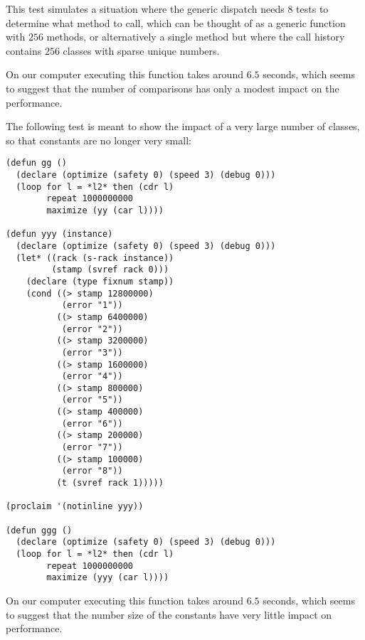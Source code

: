 This test simulates a situation where the generic dispatch needs $8$
tests to determine what method to call, which can be thought of as a
generic function with $256$ methods, or alternatively a single method
but where the call history contains $256$ classes with sparse unique
numbers. 

On our computer executing this function takes around $6.5$ seconds,
which seems to suggest that the number of comparisons has only a
modest impact on the performance.  

The following test is meant to show the impact of a very large number
of classes, so that constants are no longer very small:

\begin{verbatim}
(defun gg ()
  (declare (optimize (safety 0) (speed 3) (debug 0)))
  (loop for l = *l2* then (cdr l)
        repeat 1000000000
        maximize (yy (car l))))

(defun yyy (instance)
  (declare (optimize (safety 0) (speed 3) (debug 0)))
  (let* ((rack (s-rack instance))
         (stamp (svref rack 0)))
    (declare (type fixnum stamp))
    (cond ((> stamp 12800000)
           (error "1"))
          ((> stamp 6400000)
           (error "2"))
          ((> stamp 3200000)
           (error "3"))
          ((> stamp 1600000)
           (error "4"))
          ((> stamp 800000)
           (error "5"))
          ((> stamp 400000)
           (error "6"))
          ((> stamp 200000)
           (error "7"))
          ((> stamp 100000)
           (error "8"))
          (t (svref rack 1)))))

(proclaim '(notinline yyy))

(defun ggg ()
  (declare (optimize (safety 0) (speed 3) (debug 0)))
  (loop for l = *l2* then (cdr l)
        repeat 1000000000
        maximize (yyy (car l))))
\end{verbatim}

On our computer executing this function takes around $6.5$ seconds,
which seems to suggest that the number size of the constants have very
little impact on performance.

